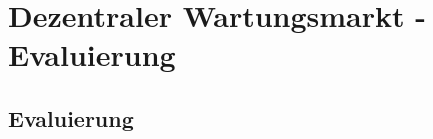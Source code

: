 \chapter{Dezentraler Wartungsmarkt - Evaluierung}
\label{cha:wartungsmarkt-impl}

\section{Evaluierung}



